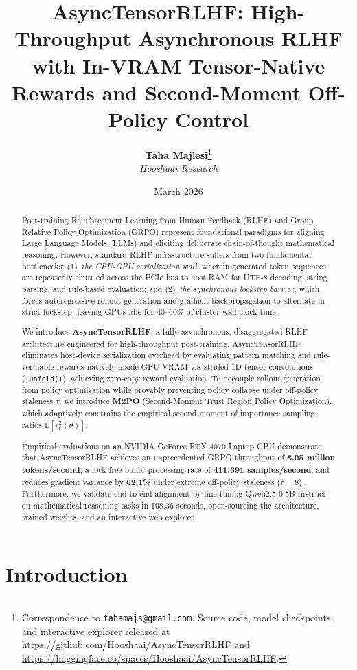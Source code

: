 \documentclass[10pt,twocolumn,letterpaper]{article}
\title{\textbf{\Large AsyncTensorRLHF: High-Throughput Asynchronous RLHF with In-VRAM Tensor-Native Rewards and Second-Moment Off-Policy Control}}
\author{
  \textbf{Taha Majlesi}\thanks{Correspondence to \texttt{tahamajs@gmail.com}. Source code, model checkpoints, and interactive explorer released at \url{https://github.com/Hooshaai/AsyncTensorRLHF} and \url{https://huggingface.co/spaces/Hooshaai/AsyncTensorRLHF}.} \\
  \textit{Hooshaai Research}
}
\date{March 2026}
\begin{document}
\maketitle

\begin{abstract}
Post-training Reinforcement Learning from Human Feedback (RLHF) and Group Relative Policy Optimization (GRPO) represent foundational paradigms for aligning Large Language Models (LLMs) and eliciting deliberate chain-of-thought mathematical reasoning. However, standard RLHF infrastructure suffers from two fundamental bottlenecks: (1)~\emph{the CPU-GPU serialization wall}, wherein generated token sequences are repeatedly shuttled across the PCIe bus to host RAM for UTF-8 decoding, string parsing, and rule-based evaluation; and (2)~\emph{the synchronous lockstep barrier}, which forces autoregressive rollout generation and gradient backpropagation to alternate in strict lockstep, leaving GPUs idle for $40\text{--}60\%$ of cluster wall-clock time.

We introduce \textbf{AsyncTensorRLHF}, a fully asynchronous, disaggregated RLHF architecture engineered for high-throughput post-training. AsyncTensorRLHF eliminates host-device serialization overhead by evaluating pattern matching and rule-verifiable rewards natively inside GPU VRAM via strided 1D tensor convolutions (\texttt{.unfold()}), achieving zero-copy reward evaluation. To decouple rollout generation from policy optimization while provably preventing policy collapse under off-policy staleness $\tau$, we introduce \textbf{M2PO} (Second-Moment Trust Region Policy Optimization), which adaptively constrains the empirical second moment of importance sampling ratios $\mathbb{E}[r_t^2(\theta)]$.

Empirical evaluations on an NVIDIA GeForce RTX 4070 Laptop GPU demonstrate that AsyncTensorRLHF achieves an unprecedented GRPO throughput of \textbf{8.05 million tokens/second}, a lock-free buffer processing rate of \textbf{411,691 samples/second}, and reduces gradient variance by \textbf{62.1\%} under extreme off-policy staleness ($\tau = 8$). Furthermore, we validate end-to-end alignment by fine-tuning Qwen2.5-0.5B-Instruct on mathematical reasoning tasks in 108.36 seconds, open-sourcing the architecture, trained weights, and an interactive web explorer.
\end{abstract}

\section{Introduction}
\end{document}
